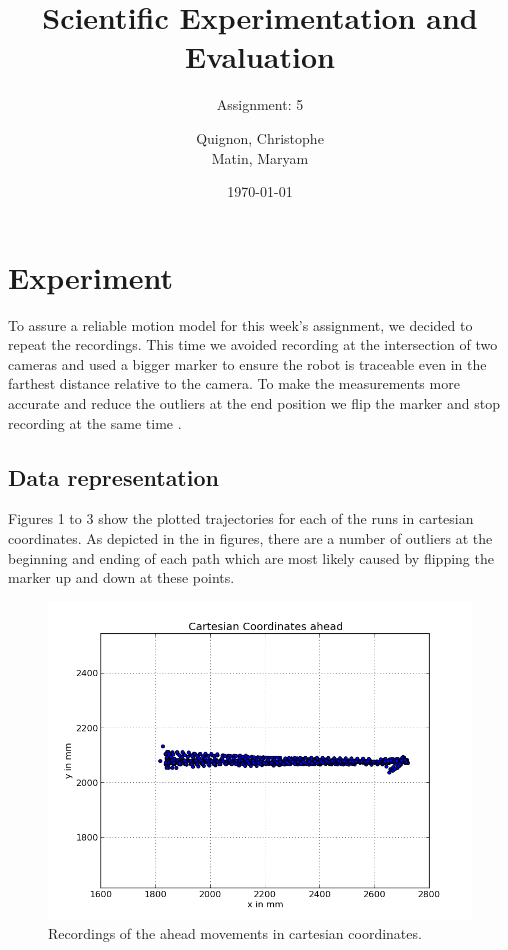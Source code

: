 \documentclass{scrartcl}
\begin{document}
\title{Scientific Experimentation and Evaluation
}
\subtitle{
Assignment: 5}
\author{
  Quignon, Christophe\\
  Matin, Maryam
}
\date{\today}


\maketitle


\section{Experiment}
To assure a reliable motion model for this week's assignment, we decided to repeat the recordings. This time we avoided recording at the intersection of two cameras and used a bigger marker to ensure the robot is traceable even in the farthest distance relative to the camera. To make the measurements more accurate and reduce the outliers at the end position we flip the marker and stop recording at the same time .  



\subsection{Data representation}
Figures 1 to 3 show the plotted trajectories for each of the runs in cartesian coordinates. As depicted in the in figures, there are a number of outliers at the beginning and ending of each path which are most likely caused by flipping the marker up and down at these points.


\begin{figure}[H]
\centering
\begin{minipage}{.5\textwidth}
  \centering
  \includegraphics[width=1\linewidth]{img_second_run/Cartesian_ahead.png}
\end{minipage}%

\caption{Recordings of the ahead movements in cartesian coordinates.}
\label{fig:outliers}
\end{figure}
\end{document}
